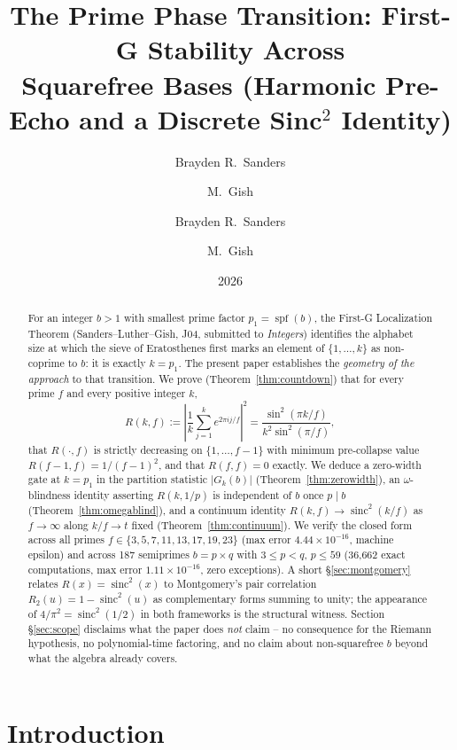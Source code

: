 \documentclass[11pt,reqno]{amsart}
\title[The Prime Phase Transition]%
{The Prime Phase Transition: First-G Stability Across\\
 Squarefree Bases (Harmonic Pre-Echo and a Discrete Sinc${}^{2}$ Identity)}
\author{Brayden R.\ Sanders \and M.\ Gish}
\author{Brayden R.\ Sanders \and M.\ Gish}
\date{2026}
\theoremstyle{plain}
\theoremstyle{definition}
\theoremstyle{remark}
\DeclareMathOperator{\spf}{spf}
\DeclareMathOperator{\sinc}{sinc}
\begin{document}
\begin{abstract}
For an integer $b > 1$ with smallest prime factor $p_1 = \spf(b)$,
the First-G Localization Theorem (Sanders--Luther--Gish, J04, submitted
to \emph{Integers}) identifies the alphabet size at which the sieve of
Eratosthenes first marks an element of $\{1, \ldots, k\}$ as
non-coprime to $b$: it is exactly $k = p_1$. The present paper
establishes the \emph{geometry of the approach} to that transition.
We prove (Theorem~\ref{thm:countdown}) that for every prime $f$ and
every positive integer $k$,
\[
  R(k, f) := \left|\frac{1}{k}\sum_{j=1}^{k} e^{2\pi i j / f}\right|^2
  = \frac{\sin^2(\pi k / f)}{k^2 \sin^2(\pi / f)},
\]
that $R(\cdot, f)$ is strictly decreasing on $\{1, \ldots, f-1\}$
with minimum pre-collapse value $R(f-1, f) = 1/(f-1)^2$, and that
$R(f, f) = 0$ exactly. We deduce a zero-width gate at $k = p_1$ in
the partition statistic $|G_k(b)|$ (Theorem~\ref{thm:zerowidth}), an
$\omega$-blindness identity asserting $R(k, 1/p)$ is independent of
$b$ once $p \mid b$ (Theorem~\ref{thm:omegablind}), and a continuum
identity $R(k, f) \to \sinc^2(k/f)$ as $f \to \infty$ along $k/f \to t$
fixed (Theorem~\ref{thm:continuum}). We verify the closed form across
all primes $f \in \{3, 5, 7, 11, 13, 17, 19, 23\}$ (max error
$4.44 \times 10^{-16}$, machine epsilon) and across 187 semiprimes
$b = p \times q$ with $3 \le p < q$, $p \le 59$ (36{,}662 exact
computations, max error $1.11 \times 10^{-16}$, zero exceptions). A
short \S\ref{sec:montgomery} relates $R(x) = \sinc^2(x)$ to
Montgomery's pair correlation $R_2(u) = 1 - \sinc^2(u)$ as
complementary forms summing to unity; the appearance of $4/\pi^2 =
\sinc^2(1/2)$ in both frameworks is the structural witness. Section
\S\ref{sec:scope} disclaims what the paper does \emph{not} claim --
no consequence for the Riemann hypothesis, no polynomial-time
factoring, and no claim about non-squarefree $b$ beyond what the
algebra already covers.
\end{abstract}

\maketitle

\section{Introduction}
\label{sec:intro}
\end{document}
